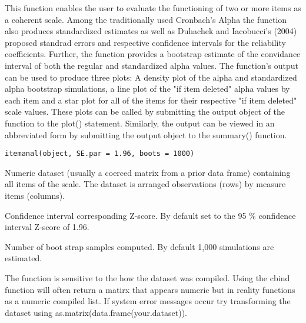 \begin{Description}\relax
This function enables the user to evaluate the functioning of two or more items as a 
coherent scale. Among the traditionally used Cronbach's Alpha the function also produces standardized estimates 
as well as Duhachek and Iacobucci's (2004) proposed standrad errors and respective confidence intervals for the
reliability coefficients. Further, the function provides a bootstrap estimate of the convidance interval of both 
the regular and standardized alpha values. The function's output can be used to produce three plots: 
A density plot of the alpha and standardized alpha bootstrap simulations, a line plot of the "if item deleted" 
alpha values by each item and a star plot for all of the items for their respective "if item deleted" scale values. 
These plots can be called by submitting the output object of the function to the plot() statement. Similarly, the
output can be viewed in an abbreviated form by submitting the output object to the summary() function.
\end{Description}
\begin{Usage}
\begin{verbatim}itemanal(object, SE.par = 1.96, boots = 1000)\end{verbatim}
\end{Usage}
\begin{Arguments}
\begin{ldescription}
\item[\code{object}] Numeric dataset (usually a coerced matrix from a prior data frame) containing all items of the scale. The dataset is arranged observations (rows) by measure items (columns). 
\item[\code{SE.par}] Confidence interval corresponding Z-score. By default set to the 95 \% confidence interval Z-score of 1.96. 
\item[\code{boots}] Number of boot strap samples computed. By default 1,000 simulations are estimated. 
\end{ldescription}
\end{Arguments}
\begin{Details}\relax
The function is sensitive to the how the dataset was compiled. Using the cbind function will often return a matirx that appears numeric but in reality functions as a numeric compiled list. If system error messages occur try transforming the dataset using as.matrix(data.frame(your.dataset)).
\end{Details}

